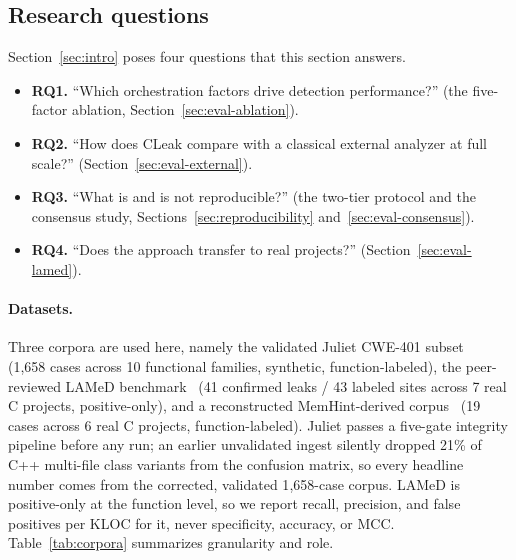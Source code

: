 \documentclass[a4paper]{llncs}
\begin{document}
\subsection{Research questions}
\label{sec:eval-rq}
Section~\ref{sec:intro} poses four questions that this section answers.
\begin{itemize}
\item \textbf{RQ1.} ``Which orchestration factors drive detection performance?'' (the five-factor ablation, Section~\ref{sec:eval-ablation}).
\item \textbf{RQ2.} ``How does CLeak compare with a classical external analyzer at full scale?'' (Section~\ref{sec:eval-external}).
\item \textbf{RQ3.} ``What is and is not reproducible?'' (the two-tier protocol and the consensus study, Sections~\ref{sec:reproducibility} and~\ref{sec:eval-consensus}).
\item \textbf{RQ4.} ``Does the approach transfer to real projects?'' (Section~\ref{sec:eval-lamed}).
\end{itemize}

\paragraph{Datasets.} Three corpora are used here, namely the validated Juliet
CWE-401 subset~\cite{juliet} (1{,}658 cases across 10 functional families, synthetic,
function-labeled), the peer-reviewed LAMeD benchmark~\cite{lamed,lamed-benchmark} (41 confirmed leaks /
43 labeled sites across 7 real C projects, positive-only), and a
reconstructed
MemHint-derived corpus~\cite{memhint} (19 cases across 6 real C projects,
function-labeled). Juliet passes a five-gate integrity pipeline before
any run; an earlier unvalidated ingest silently dropped 21\%
of C++ multi-file class variants from the confusion matrix, so every
headline number comes from the corrected, validated 1{,}658-case
corpus.
LAMeD is positive-only at the function level, so we report recall,
precision, and false positives per KLOC for it, never specificity,
accuracy, or MCC. Table~\ref{tab:corpora} summarizes granularity and role.
\end{document}
